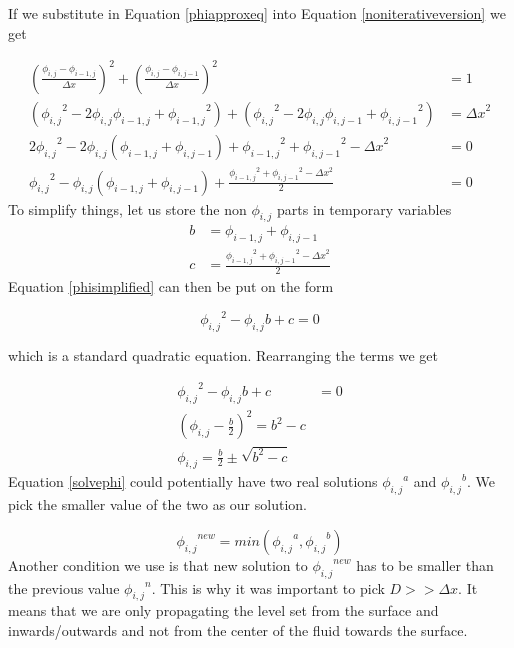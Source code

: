 If we substitute in Equation \ref{phiapproxeq} into Equation \ref{noniterativeversion} we get

\begin{equation}
\begin{split}
{(\frac{\phi_{i,j} - \phi_{i-1,j}}{\Delta x})}^2 + {(\frac{\phi_{i,j} - \phi_{i,j-1}}{\Delta x})}^2 &= 1 \\ 
({\phi_{i,j}}^2 - 2\phi_{i,j}\phi_{i-1,j} + {\phi_{i-1,j}}^2) + 
({\phi_{i,j}}^2 - 2\phi_{i,j}\phi_{i,j-1} + {\phi_{i,j-1}}^2)
&= {\Delta x}^2 \\
2{\phi_{i,j}}^2 - 2\phi_{i,j}(\phi_{i-1,j} + \phi_{i,j-1}) + {\phi_{i-1,j}}^2 + {\phi_{i,j-1}}^2 - {\Delta x}^2 &= 0 \\
{\phi_{i,j}}^2 - \phi_{i,j}(\phi_{i-1,j} + \phi_{i,j-1}) + \frac{{\phi_{i-1,j}}^2 + {\phi_{i,j-1}}^2 - {\Delta x}^2}{2} &= 0
\end{split}
\label{phisimplified}
\end{equation}
\noindent
To simplify things, let us store the non $\phi_{i,j}$ parts in temporary variables
\begin{equation}
\begin{split}
b &= \phi_{i-1,j} + \phi_{i,j-1} \\
c &= \frac{{\phi_{i-1,j}}^2 + {\phi_{i,j-1}}^2 - {\Delta x}^2}{2}
\end{split}
\label{variablesreinit}
\end{equation}
\noindent
Equation \ref{phisimplified} can then be put on the form

\begin{equation} 
{\phi_{i,j}}^2 - \phi_{i,j} b + c = 0
\end{equation}

which is a standard quadratic equation. Rearranging the terms we get

\begin{equation} 
\begin{split}
{\phi_{i,j}}^2 - \phi_{i,j} b + c &= 0 \\
{(\phi_{i,j} - \frac{b}{2})}^2  = b^2 - c \\
\phi_{i,j} =  \frac{b}{2} \pm \sqrt{b^2 - c}
\end{split}
\label{solvephi}
\end{equation}
\noindent
Equation \ref{solvephi} could potentially have two real solutions ${\phi_{i,j}}^a$ and ${\phi_{i,j}}^b$. We pick the smaller value of the two as our solution. 

\begin{equation}
{\phi_{i,j}}^{new} = min({\phi_{i,j}}^a, {\phi_{i,j}}^b)
\end{equation}
\noindent
Another condition we use is that new solution to ${\phi_{i,j}}^{new}$ has to be smaller than the previous value ${\phi_{i,j}}^{n}$. This is why it was important to pick $D >> \Delta x$. It means that we are only propagating the level set from the surface and inwards/outwards and not from the center of the fluid towards the surface.

